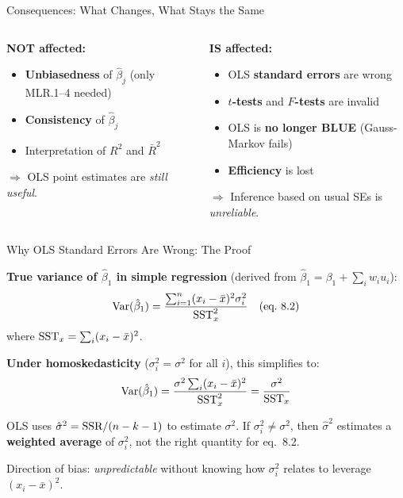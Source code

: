 \documentclass[aspectratio=169, 12pt]{beamer}
\begin{document}
\begin{frame}{Consequences: What Changes, What Stays the Same}

  \begin{columns}[t]
    \begin{highlightbox}
      \textbf{\textcolor{positive}{NOT affected:}}
      \begin{itemize}
        \item \textbf{Unbiasedness} of $\hat{\beta}_j$ (only MLR.1--4 needed)
        \item \textbf{Consistency} of $\hat{\beta}_j$
        \item Interpretation of $R^2$ and $\bar{R}^2$
      \end{itemize}
      \smallskip
      $\Rightarrow$ OLS point estimates are \textit{still useful}.
    \end{highlightbox}

    \begin{highlightbox}
      \textbf{\textcolor{negative}{IS affected:}}
      \begin{itemize}
        \item OLS \textbf{standard errors} are wrong
        \item $t$\textbf{-tests} and $F$\textbf{-tests} are invalid
        \item OLS is \textbf{no longer BLUE} (Gauss-Markov fails)
        \item \textbf{Efficiency} is lost
      \end{itemize}
      \smallskip
      $\Rightarrow$ Inference based on usual SEs is \textit{unreliable}.
    \end{highlightbox}
  \end{columns}

\end{frame}

\begin{frame}{Why OLS Standard Errors Are Wrong: The Proof}

  \textbf{True variance of $\hat{\beta}_1$ in simple regression} (derived from $\hat{\beta}_1 = \beta_1 + \sum_i w_i u_i$):
  \[
    \operatorname{Var}(\hat{\beta}_1) = \frac{\sum_{i=1}^n (x_i - \bar{x})^2 \sigma_i^2}{\text{SST}_x^2} \quad \text{(eq.\ 8.2)}
  \]
  where $\text{SST}_x = \sum_i(x_i-\bar{x})^2$.

  \smallskip

  \textbf{Under homoskedasticity} ($\sigma_i^2 = \sigma^2$ for all $i$), this simplifies to:
  \[
    \operatorname{Var}(\hat{\beta}_1) = \frac{\sigma^2 \sum_i(x_i-\bar{x})^2}{\text{SST}_x^2} = \frac{\sigma^2}{\text{SST}_x}
  \]

  \begin{keybox}
    OLS uses $\hat{\sigma}^2 = \text{SSR}/(n-k-1)$ to estimate $\sigma^2$. If $\sigma_i^2 \neq \sigma^2$, then $\hat{\sigma}^2$ estimates a \textbf{weighted average} of $\sigma_i^2$, not the right quantity for eq.\ 8.2.

    \smallskip
    Direction of bias: \textit{unpredictable} without knowing how $\sigma_i^2$ relates to leverage $(x_i-\bar{x})^2$.
  \end{keybox}

\end{frame}
\end{document}
